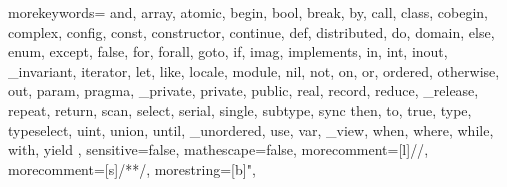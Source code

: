   {
    morekeywords={
      and, array, atomic,
      begin, bool, break, by,
      call, class, cobegin, complex, config, const, constructor, continue,
      def, distributed, do, domain,
      else, enum, except,
      false, for, forall,
      goto,
      if, imag, implements, in, int, inout, _invariant, iterator,
      let, like, locale,
      module,
      nil, not,
      on, or, ordered, otherwise, out,
      param, pragma, _private, private, public,
      real, record, reduce, _release, repeat, return,
      scan, select, serial, single, subtype, sync
      then, to, true, type, typeselect,
      uint, union, until, _unordered, use,
      var, _view,
      when, where, while, with,
      yield
    },
    sensitive=false,
    mathescape=false,
    morecomment=[l]{//},
    morecomment=[s]{/*}{*/},
    morestring=[b]",
}

\lstset{
    basicstyle=\footnotesize\ttfamily,
    keywordstyle=\bfseries,
    commentstyle=\em,
    showstringspaces=false,
    flexiblecolumns=false,
    numbers=left,
    numbersep=5pt,
    numberstyle=\tiny,
    numberblanklines=false,
    stepnumber=0
  }

\newcommand{\chpl}[1]{\lstinline[language=chapel,basicstyle=\normalsize\ttfamily,keywordstyle=]!#1!}

